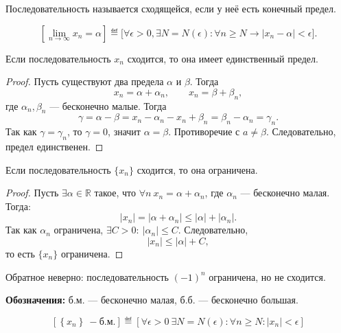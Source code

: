

\begin{definition}
Последовательность называется сходящейся, если у неё есть конечный предел.
\end{definition}

\begin{definition}
\[
\left[\lim_{n\to\infty} x_n = \alpha\right] \eqdef
\bigl[\forall \epsilon>0, \exists N = N(\epsilon)\colon \forall n\ge N
\to |x_n-\alpha|<\epsilon\bigr].
\]
\end{definition}

\begin{theorem}
Если последовательность \(x_n\) сходится, то она имеет единственный предел.
\end{theorem}

\begin{proof}
Пусть существуют два предела \(\alpha\) и \(\beta\). Тогда
\[
x_n = \alpha + \alpha_n,\qquad x_n = \beta + \beta_n,
\]
где \(\alpha_n,\beta_n\) --- бесконечно малые. Тогда
\[
\gamma = \alpha-\beta
= x_n-\alpha_n - x_n + \beta_n
= \beta_n-\alpha_n
= \gamma_n.
\]
Так как \(\gamma=\gamma_n\), то \(\gamma=0\), значит \(\alpha=\beta\).
Противоречие с \(a\ne\beta\). Следовательно, предел единственен.
\end{proof}

\begin{theorem}
Если последовательность \(\{x_n\}\) сходится, то она ограничена.
\end{theorem}

\begin{proof}
Пусть \(\exists \alpha\in\mathbb R\) такое, что
\(\forall n\ x_n=\alpha+\alpha_n\), где
\(\alpha_n\) --- бесконечно малая. Тогда:
\[
|x_n| = |\alpha+\alpha_n| \le |\alpha| + |\alpha_n|.
\]
Так как \(\alpha_n\) ограничена, \(\exists C>0:\ |\alpha_n|\le C\).
Следовательно,
\[
|x_n| \le |\alpha| + C,
\]
то есть \(\{x_n\}\) ограничена.
\end{proof}

Обратное неверно: последовательность \((-1)^n\) ограничена, но не сходится.


\textbf{Обозначения:} \(\text{б.м.}\) --- бесконечно малая,
\(\text{б.б.}\) --- бесконечно большая.

\begin{definition}
\[
\left[\left\{x_n\right\}~-\text{б.м.}\right] \eqdef
\left[\forall\epsilon > 0\ \exists N = N(\epsilon) \colon \forall n
\geq N\colon |x_n| < \epsilon\right]
\]
\end{definition}

